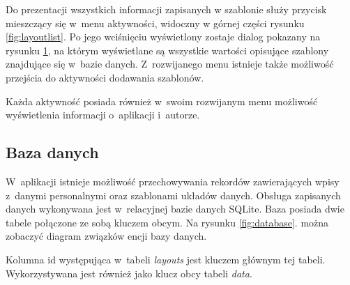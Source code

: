 \documentclass[a4paper,12pt, twoside]{article}
\begin{document}
\begin{enumerate}
\begin{figure}[H]
\begin{minipage}{.5\textwidth}
                    \label{fig:layoutlistDialog}
                \end{minipage}%
    	   \end{figure}
           Do prezentacji wszystkich informacji zapisanych w szablonie służy przycisk mieszczący się w~menu aktywności, widoczny w górnej części rysunku \ref{fig:layoutlist}. Po jego wciśnięciu wyświetlony zostaje dialog pokazany na rysunku \ref{fig:layoutlistDialog}, na którym wyświetlane są wszystkie wartości opisujące szablony znajdujące się w~bazie danych. Z~rozwijanego menu istnieje także możliwość przejścia do aktywności dodawania szablonów.
           
    	\end{enumerate}
    	
    	Każda aktywność posiada również w~swoim rozwijanym menu możliwość wyświetlenia informacji o~aplikacji i~autorze.
 
        \subsection{Baza danych}
        W~aplikacji istnieje możliwość przechowywania rekordów zawierających wpisy z~danymi personalnymi oraz szablonami układów danych. Obsługa zapisanych danych wykonywana jest w~relacyjnej bazie danych SQLite. Baza posiada dwie tabele połączone ze sobą kluczem obcym. Na rysunku \ref{fig:database}. można zobaczyć diagram związków encji bazy danych. 
        
        Kolumna id występująca w~tabeli \textit{layouts} jest kluczem głównym tej tabeli. Wykorzystywana jest również jako klucz obcy tabeli \textit{data}. 
        
\end{document}
